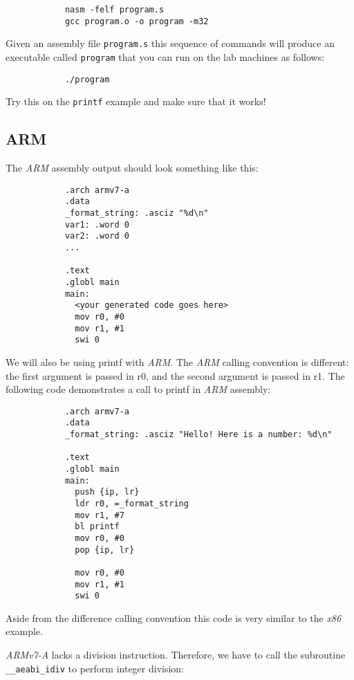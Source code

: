 \documentclass{article}
\newcommand{\code}[1]{\texttt{\textmd{#1}}}
\begin{document}
		\begin{lstlisting}
			nasm -felf program.s
			gcc program.o -o program -m32
		\end{lstlisting}
		
		Given an assembly file \texttt{program.s} this sequence of commands will produce an executable called
		\texttt{program} that you can run on the lab machines as follows:
		
		\begin{lstlisting}
			./program
		\end{lstlisting}
		
		Try this on the \code{printf} example and make sure that it works!
	
	
	\subsection{ARM}

		The \textit{ARM} assembly output should look something like this:
		
		\begin{lstlisting}
			.arch armv7-a
			.data
			_format_string: .asciz "%d\n"
			var1: .word 0
			var2: .word 0
			...
			
			.text
			.globl main
			main:
			  <your generated code goes here>
			  mov r0, #0
			  mov r1, #1
			  swi 0
		\end{lstlisting}
		
		We will also be using printf with \textit{ARM}. The \textit{ARM} calling convention is different: the first
		argument is passed in r0, and the second argument is passed in r1. The following code demonstrates a call to
		printf in \textit{ARM} assembly:
		
		\begin{lstlisting}
			.arch armv7-a
			.data
			_format_string: .asciz "Hello! Here is a number: %d\n"
			
			.text
			.globl main
			main:
			  push {ip, lr}
			  ldr r0, =_format_string
			  mov r1, #7
			  bl printf
			  mov r0, #0
			  pop {ip, lr}
			
			  mov r0, #0
			  mov r1, #1
			  swi 0
		\end{lstlisting}
		
		Aside from the difference calling convention this code is very similar to the \textit{x86} example.
		
		\textit{ARMv7-A} lacks a division instruction. Therefore, we have to call the subroutine
		\texttt{\_\_aeabi\_idiv} to perform integer division:
		
\end{document}
